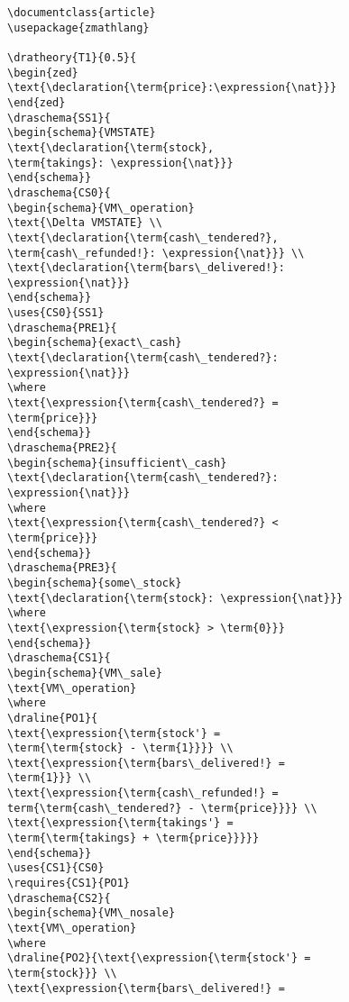\begin{verbatim}
\documentclass{article}
\usepackage{zmathlang}

\dratheory{T1}{0.5}{
\begin{zed}
\text{\declaration{\term{price}:\expression{\nat}}}
\end{zed}
\draschema{SS1}{
\begin{schema}{VMSTATE}
\text{\declaration{\term{stock},
\term{takings}: \expression{\nat}}}
\end{schema}}
\draschema{CS0}{
\begin{schema}{VM\_operation}
\text{\Delta VMSTATE} \\
\text{\declaration{\term{cash\_tendered?},
\term{cash\_refunded!}: \expression{\nat}}} \\
\text{\declaration{\term{bars\_delivered!}:
\expression{\nat}}}
\end{schema}}
\uses{CS0}{SS1}
\draschema{PRE1}{
\begin{schema}{exact\_cash}
\text{\declaration{\term{cash\_tendered?}:
\expression{\nat}}}
\where
\text{\expression{\term{cash\_tendered?} =
\term{price}}}
\end{schema}}
\draschema{PRE2}{
\begin{schema}{insufficient\_cash}
\text{\declaration{\term{cash\_tendered?}: 
\expression{\nat}}}
\where
\text{\expression{\term{cash\_tendered?} <
\term{price}}}
\end{schema}}
\draschema{PRE3}{
\begin{schema}{some\_stock}
\text{\declaration{\term{stock}: \expression{\nat}}}
\where
\text{\expression{\term{stock} > \term{0}}}
\end{schema}}
\draschema{CS1}{
\begin{schema}{VM\_sale}
\text{VM\_operation}
\where
\draline{PO1}{
\text{\expression{\term{stock'} = 
\term{\term{stock} - \term{1}}}} \\
\text{\expression{\term{bars\_delivered!} =
\term{1}}} \\
\text{\expression{\term{cash\_refunded!} =
term{\term{cash\_tendered?} - \term{price}}}} \\
\text{\expression{\term{takings'} =
\term{\term{takings} + \term{price}}}}}
\end{schema}}
\uses{CS1}{CS0}
\requires{CS1}{PO1}
\draschema{CS2}{
\begin{schema}{VM\_nosale}
\text{VM\_operation}
\where
\draline{PO2}{\text{\expression{\term{stock'} =
\term{stock}}} \\
\text{\expression{\term{bars\_delivered!} =

\end{verbatim}
